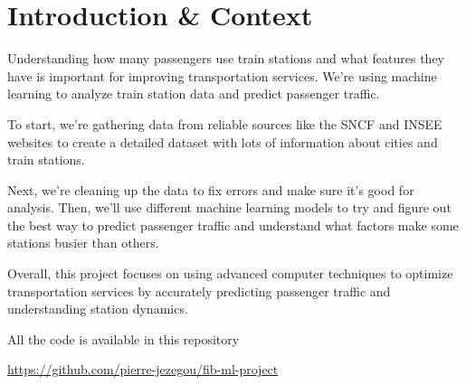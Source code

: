 \section*{Introduction \& Context}
Understanding how many passengers use train stations and what features they have is important for improving transportation services. We're using machine learning to analyze train station data and predict passenger traffic.

To start, we're gathering data from reliable sources like the SNCF and INSEE websites to create a detailed dataset with lots of information about cities and train stations.

Next, we're cleaning up the data to fix errors and make sure it's good for analysis. Then, we'll use different machine learning models to try and figure out the best way to predict passenger traffic and understand what factors make some stations busier than others.

Overall, this project focuses on using advanced computer techniques to optimize transportation services by accurately predicting passenger traffic and understanding station dynamics.

All the code is available in this repository
\begin{center}
    \textcolor{fib_red}{\url{https://github.com/pierre-jezegou/fib-ml-project}}
\end{center}